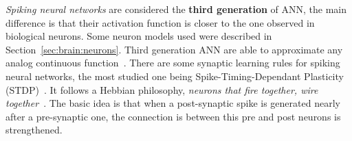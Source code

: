 \emph{Spiking neural networks} are considered the \textbf{third generation} of ANN, the main difference is that their activation function is closer to the one observed in biological neurons. Some neuron models used were described in Section~\ref{sec:brain:neurons}. Third generation ANN are able to approximate any analog continuous function~\cite{third-gen-nn-Maass1997}. 
There are some synaptic learning rules for spiking neural networks, the most studied one being Spike-Timing-Dependant Plasticity (STDP)~\cite{STDP-Song2000}. 
It follows a Hebbian philosophy, \emph{neurons that fire together, wire together}~\cite{hebb2005organization}. The basic idea is that when a post-synaptic spike is generated nearly after a pre-synaptic one, the connection is between this pre and post neurons is strengthened.\\

